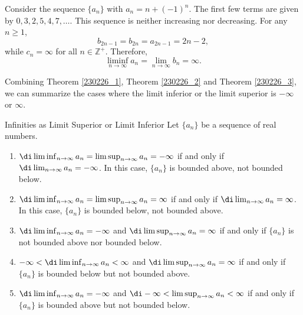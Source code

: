\begin{example}{}
Consider the sequence $\{a_n\}$ with $a_n=n+(-1)^{n}$. The first few terms are given by
$0, 3, 2, 5, 4, 7, \ldots$.
This sequence is neither increasing nor decreasing. For any $n\geq 1$,
\[b_{2n-1}=b_{2n}=a_{2n-1}=2n-2,\]
while $c_n=\infty$ for all $n\in\mathbb{Z}^+$. Therefore, \[\liminf_{n\to\infty}a_n=\lim_{n\to\infty}b_n=\infty.\]
\end{example}

Combining Theorem \ref{230226_1}, Theorem \ref{230226_2} and Theorem \ref{230226_3}, we can summarize the cases where the limit inferior or the limit superior is $-\infty$ or $\infty$.
\begin{highlight}{Infinities as Limit Superior or Limit Inferior}
Let $\{a_n\}$ be a sequence of real numbers.
\begin{enumerate}[1.]
\item $\di\liminf_{n\to\infty}a_n=\limsup_{n\to\infty}a_n=-\infty$ if and only if $\di\lim_{n\to\infty}a_n=-\infty$. In this case, $\{a_n\}$ is bounded above, not bounded below.
\item $\di\liminf_{n\to\infty}a_n=\limsup_{n\to\infty}a_n= \infty$ if and only if $\di\lim_{n\to\infty}a_n= \infty$. In this case, $\{a_n\}$ is bounded below, not bounded above.
\item $\di\liminf_{n\to\infty}a_n=-\infty$ and $\di\limsup_{n\to\infty}a_n= \infty$ if and only if $\{a_n\}$ is not bounded above nor bounded below.
\item  $-\infty<\di\liminf_{n\to\infty}a_n<\infty$ and $\di\limsup_{n\to\infty}a_n= \infty$ if and only if $\{a_n\}$ is bounded below but not bounded above.
\item $\di\liminf_{n\to\infty}a_n=-\infty$ and $\di -\infty<\limsup_{n\to\infty}a_n< \infty$ if and only if $\{a_n\}$ is bounded above but not bounded below.
\end{enumerate}
\end{highlight}
 
